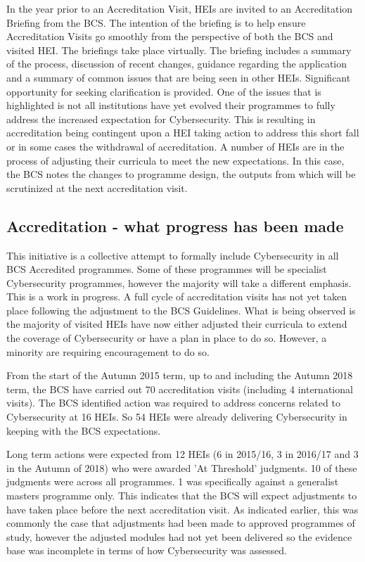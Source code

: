 \documentclass[conference]{IEEEtran}
\begin{document}
In the year prior to an Accreditation Visit, HEIs are invited to an Accreditation Briefing from the BCS. The intention of the briefing is to help ensure Accreditation Visits go smoothly from the perspective of both the BCS and visited HEI. The briefings take place virtually. The briefing includes a summary of the process, discussion of recent changes, guidance regarding the application and a summary of common issues that are being seen in other HEIs. Significant opportunity for seeking clarification is provided. One of the issues that is highlighted is not all institutions have yet evolved their programmes to fully address the increased expectation for Cybersecurity. This is resulting in accreditation being contingent upon a HEI taking action to address this short fall or in some cases the withdrawal of accreditation. A number of HEIs are in the process of adjusting their curricula to meet the new expectations. In this case, the BCS notes the changes to programme design, the outputs from which will be scrutinized at the next accreditation visit.

\subsection{Accreditation - what progress has been made}

This initiative is a collective attempt to formally include Cybersecurity in all BCS Accredited programmes. Some of these programmes will be specialist Cybersecurity programmes, however the majority will take a different emphasis. This is a work in progress. A full cycle of accreditation visits has not yet taken place following the adjustment to the BCS Guidelines. What is being observed is the majority of visited HEIs have now either adjusted their curricula to extend the coverage of Cybersecurity or have a plan in place to do so. However, a minority are requiring encouragement to do so.

From the start of the Autumn 2015 term, up to and including the Autumn 2018 term, the BCS have carried out 70 accreditation visits (including 4 international visits). The BCS identified action was required to address concerns related to Cybersecurity at 16 HEIs. So 54 HEIs were already delivering Cybersecurity in keeping with the BCS expectations.

Long term actions were expected from 12 HEIs (6 in 2015/16, 3 in 2016/17 and 3 in the Autumn of 2018) who were awarded 'At Threshold' judgments. 10 of these judgments were across all programmes. 1 was specifically against a generalist masters programme only. This indicates that the BCS will expect adjustments to have taken place before the next accreditation visit. As indicated earlier, this was commonly the case that adjustments had been made to approved programmes of study, however the adjusted modules had not yet been delivered so the evidence base was incomplete in terms of how Cybersecurity was assessed.
 
\end{document}
